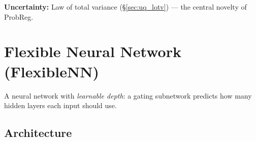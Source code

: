 \documentclass[11pt,a4paper]{article}
\theoremstyle{definition}
\begin{document}
\textbf{Uncertainty:} Law of total variance (\S\ref{sec:uq_lotv}) ---
the central novelty of ProbReg.

\section{Flexible Neural Network (FlexibleNN)}
\label{sec:flexnn}

A neural network with \emph{learnable depth}: a gating subnetwork
predicts how many hidden layers each input should use.

\subsection{Architecture}
\end{document}
